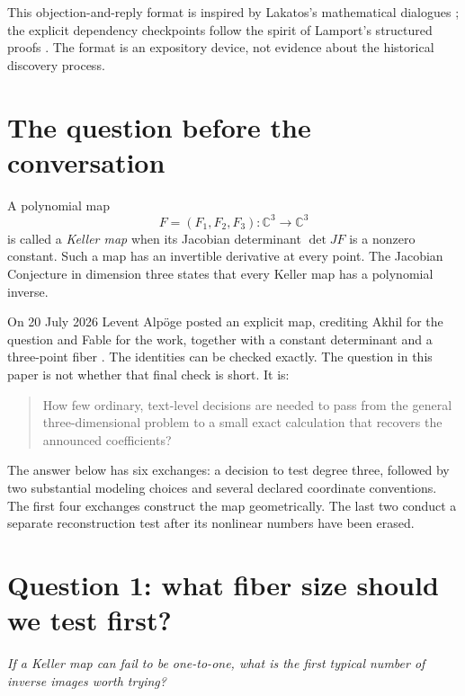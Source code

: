\documentclass[11pt,a4paper]{article}
\numberwithin{equation}{section}
\theoremstyle{definition}
\theoremstyle{remark}
\newcommand{\C}{\mathbb C}
\newenvironment{userquestion}
  {\par\medskip\noindent{\color{userblue}\bfseries USER}\quad
   \begin{minipage}[t]{0.84\linewidth}\itshape}
  {\end{minipage}\par\medskip}
\begin{document}
This objection-and-reply format is inspired by Lakatos's mathematical
dialogues \cite{Lakatos}; the explicit dependency checkpoints follow the
spirit of Lamport's structured proofs \cite{Lamport}.  The format is an
expository device, not evidence about the historical discovery process.

\section{The question before the conversation}

A polynomial map
\[
  F=(F_1,F_2,F_3):\C^3\longrightarrow\C^3
\]
is called a \emph{Keller map} when its Jacobian determinant
\(\det JF\) is a nonzero constant.  Such a map has an invertible derivative
at every point.  The Jacobian Conjecture in dimension three states that
every Keller map has a polynomial inverse.

On 20 July 2026 Levent Alp\"oge posted an explicit map, crediting Akhil for
the question and Fable for the work, together with a constant determinant and
a three-point fiber \cite{Alpoge}.  The identities can be checked exactly.
The question in this paper is not whether that final check is short.  It is:

\begin{quote}
How few ordinary, text-level decisions are needed to pass from the general
three-dimensional problem to a small exact calculation that recovers the
announced coefficients?
\end{quote}

The answer below has six exchanges: a decision to test degree three, followed
by two substantial modeling choices and several declared coordinate
conventions.  The first four exchanges construct the map geometrically.  The
last two conduct a separate reconstruction test after its nonlinear numbers
have been erased.

\section{Question 1: what fiber size should we test first?}

\begin{userquestion}
If a Keller map can fail to be one-to-one, what is the first typical number of
inverse images worth trying?
\end{userquestion}
\end{document}
